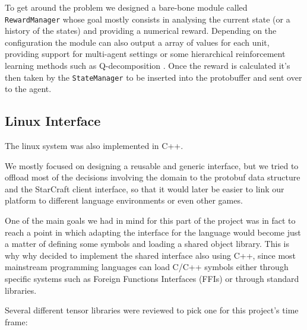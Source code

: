 
To get around the problem we designed a bare-bone module called
\texttt{RewardManager} whose goal mostly consists in analysing the current state
(or a history of the states) and providing a numerical reward. Depending on the
configuration the module can also output a array of values for each unit,
providing support for multi-agent settings or some hierarchical reinforcement
learning methods such as Q-decomposition \citep{russell2003q}. Once the reward
is calculated it's then taken by the \texttt{StateManager} to be inserted into
the protobuffer and sent over to the agent.


\subsection{Linux Interface}

The linux system was also implemented in C++. 

We mostly focused on designing a reusable and generic interface, but we tried to
offload most of the decisions involving the domain to the protobuf data
structure and the StarCraft client interface, so that it
would later be easier to link our platform to different language environments or
even other games. 

One of the main goals we had in mind for this part of the project was in fact to
reach a point in which adapting the interface for the language would become just
a matter of defining some symbols and loading a shared object library. This is
why why decided to implement the shared interface also using C++, since most
mainstream programming languages can load C/C++ symbols either through specific
systems such as Foreign Functions Interfaces (FFIs) or through standard
libraries.

Several different tensor libraries were reviewed to pick one for this project's
time frame:

